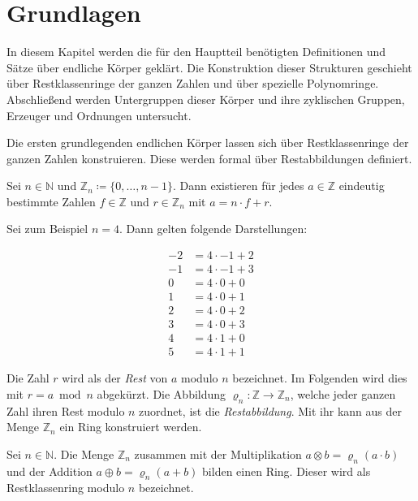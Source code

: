 \section{Grundlagen} \label{sec:grundlagen}

In diesem Kapitel werden die für den Hauptteil benötigten Definitionen und Sätze über endliche Körper geklärt. Die Konstruktion dieser Strukturen geschieht über Restklassenringe der ganzen Zahlen und über spezielle Polynomringe. Abschließend werden Untergruppen dieser Körper und ihre zyklischen Gruppen, Erzeuger und Ordnungen untersucht.

Die ersten grundlegenden endlichen Körper lassen sich über Restklassenringe der ganzen Zahlen konstruieren. Diese werden formal über Restabbildungen definiert.

\begin{satz}
    Sei $n \in \mathbb{N}$ und $\mathbb{Z}_n \coloneqq \{0,\dots,n-1\}$. Dann existieren für jedes $a \in \mathbb{Z}$ eindeutig bestimmte Zahlen $f \in \mathbb{Z}$ und $r \in \mathbb{Z}_n$ mit $a = n \cdot f + r$.
\end{satz}

Sei zum Beispiel $n = 4$. Dann gelten folgende Darstellungen:

\begin{align*}
    -2 &= 4 \cdot -1 + 2 \\
    -1 &= 4 \cdot -1 + 3 \\
    0 &= 4 \cdot 0 + 0 \\
    1 &= 4 \cdot 0 + 1 \\
    2 &= 4 \cdot 0 + 2 \\
    3 &= 4 \cdot 0 + 3 \\
    4 &= 4 \cdot 1 + 0 \\
    5 &= 4 \cdot 1 + 1
\end{align*}

Die Zahl $r$ wird als der \emph{Rest} von $a$ modulo $n$ bezeichnet. Im Folgenden wird dies mit $r = a \bmod n$ abgekürzt. Die Abbildung $\varrho_n : \mathbb{Z} \rightarrow \mathbb{Z}_n$, welche jeder ganzen Zahl ihren Rest modulo $n$ zuordnet, ist die \emph{Restabbildung}. Mit ihr kann aus der Menge $\mathbb{Z}_n$ ein Ring konstruiert werden.

\begin{satz}
    Sei $n \in \mathbb{N}$. Die Menge $\mathbb{Z}_n$ zusammen mit der Multiplikation ${a \otimes b = \varrho_n(a \cdot b)}$ und der Addition $a \oplus b = \varrho_n(a + b)$ bilden einen Ring. Dieser wird als Restklassenring modulo $n$ bezeichnet.
\end{satz}

